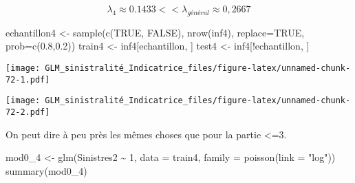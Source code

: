 \documentclass[
]{article}
\newenvironment{Shaded}{\begin{snugshade}}{\end{snugshade}}
\newcommand{\AttributeTok}[1]{\textcolor[rgb]{0.77,0.63,0.00}{#1}}
\newcommand{\ConstantTok}[1]{\textcolor[rgb]{0.00,0.00,0.00}{#1}}
\newcommand{\DecValTok}[1]{\textcolor[rgb]{0.00,0.00,0.81}{#1}}
\newcommand{\FloatTok}[1]{\textcolor[rgb]{0.00,0.00,0.81}{#1}}
\newcommand{\FunctionTok}[1]{\textcolor[rgb]{0.00,0.00,0.00}{#1}}
\newcommand{\NormalTok}[1]{#1}
\newcommand{\OtherTok}[1]{\textcolor[rgb]{0.56,0.35,0.01}{#1}}
\newcommand{\SpecialCharTok}[1]{\textcolor[rgb]{0.00,0.00,0.00}{#1}}
\newcommand{\StringTok}[1]{\textcolor[rgb]{0.31,0.60,0.02}{#1}}
\begin{document}
\[
 \lambda_4 \approx 0.1433 << \lambda_{général} \approx 0,2667
\]

\begin{Shaded}
\begin{Highlighting}[]
\NormalTok{echantillon4 }\OtherTok{\textless{}{-}} \FunctionTok{sample}\NormalTok{(}\FunctionTok{c}\NormalTok{(}\ConstantTok{TRUE}\NormalTok{, }\ConstantTok{FALSE}\NormalTok{), }\FunctionTok{nrow}\NormalTok{(inf4), }\AttributeTok{replace=}\ConstantTok{TRUE}\NormalTok{, }\AttributeTok{prob=}\FunctionTok{c}\NormalTok{(}\FloatTok{0.8}\NormalTok{,}\FloatTok{0.2}\NormalTok{))}
\NormalTok{train4  }\OtherTok{\textless{}{-}}\NormalTok{ inf4[echantillon, ]}
\NormalTok{test4   }\OtherTok{\textless{}{-}}\NormalTok{ inf4[}\SpecialCharTok{!}\NormalTok{echantillon, ]}
\end{Highlighting}
\end{Shaded}

\begin{Shaded}
\end{Shaded}

\texttt{[image: GLM\_sinistralité\_Indicatrice\_files/figure-latex/unnamed-chunk-72-1.pdf]}

\begin{Shaded}
\end{Shaded}

\texttt{[image: GLM\_sinistralité\_Indicatrice\_files/figure-latex/unnamed-chunk-72-2.pdf]}

On peut dire à peu près les mêmes choses que pour la partie \textless=3.

\begin{Shaded}
\begin{Highlighting}[]
\NormalTok{mod0\_4 }\OtherTok{\textless{}{-}} \FunctionTok{glm}\NormalTok{(Sinistres2 }\SpecialCharTok{\textasciitilde{}} \DecValTok{1}\NormalTok{, }\AttributeTok{data =}\NormalTok{ train4, }\AttributeTok{family =} \FunctionTok{poisson}\NormalTok{(}\AttributeTok{link =} \StringTok{"log"}\NormalTok{))}
\FunctionTok{summary}\NormalTok{(mod0\_4)}
\end{Highlighting}
\end{Shaded}
\end{document}
